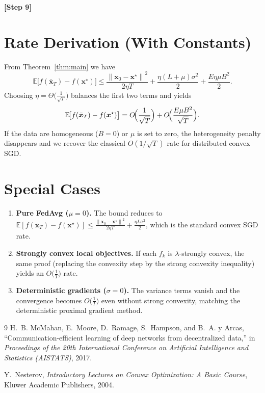 \documentclass{article}
\newcommand{\E}{\mathbb{E}}
\newcommand{\norm}[1]{\left\lVert #1\right\rVert}
\begin{document}
\textbf{[Step 9]}

\section*{Rate Derivation (With Constants)}
From Theorem~\ref{thm:main} we have
\[
\E\!\bigl[f(\bar{\bm{x}}_T)-f(\bm{x}^\star)\bigr]
   \le \frac{\norm{\bm{x}_0-\bm{x}^\star}^{2}}{2\eta T}
        +\frac{\eta(L+\mu)\sigma^{2}}{2}
        +\frac{E\eta\mu B^{2}}{2}.
\]
Choosing $\eta = \Theta\!\bigl(\tfrac{1}{\sqrt{T}}\bigr)$ balances the first two
terms and yields
\[
\E\!\bigl[f(\bar{\bm{x}}_T)-f(\bm{x}^\star)\bigr]=O\!\Bigl(\frac{1}{\sqrt{T}}\Bigr)
      + O\!\Bigl(\frac{E\mu B^{2}}{\sqrt{T}}\Bigr).
\]
If the data are homogeneous ($B=0$) or $\mu$ is set to zero, the
heterogeneity penalty disappears and we recover the classical $O(1/\sqrt{T})$
rate for distributed convex SGD.

\section*{Special Cases}
\begin{enumerate}[label=(\alph*)]
    \item \textbf{Pure FedAvg ($\mu=0$).}
          The bound reduces to
          $\displaystyle
          \E[f(\bar{\bm{x}}_T)-f(\bm{x}^\star)]
          \le \frac{\norm{\bm{x}_0-\bm{x}^\star}^{2}}{2\eta T}
                +\frac{\eta L\sigma^{2}}{2}$,
          which is the standard convex SGD rate.
    \item \textbf{Strongly convex local objectives.}
          If each $f_k$ is $\lambda$‑strongly convex, the same proof
          (replacing the convexity step by the strong convexity inequality)
          yields an $O\!\bigl(\frac{1}{T}\bigr)$ rate.
    \item \textbf{Deterministic gradients ($\sigma=0$).}
          The variance terms vanish and the convergence becomes
          $O\!\bigl(\frac{1}{T}\bigr)$ even without strong convexity,
          matching the deterministic proximal gradient method.
\end{enumerate}

\begin{thebibliography}{9}
H.~B. McMahan, E.~Moore, D.~Ramage, S.~Hampson, and B.~A. y Arcas,
\newblock ``Communication-efficient learning of deep networks from
  decentralized data,''
\newblock in \emph{Proceedings of the 20th International Conference on
  Artificial Intelligence and Statistics (AISTATS)}, 2017.

Y.~Nesterov,
\newblock \emph{Introductory Lectures on Convex Optimization: A Basic
  Course},
\newblock Kluwer Academic Publishers, 2004.
\end{thebibliography}
\end{document}
